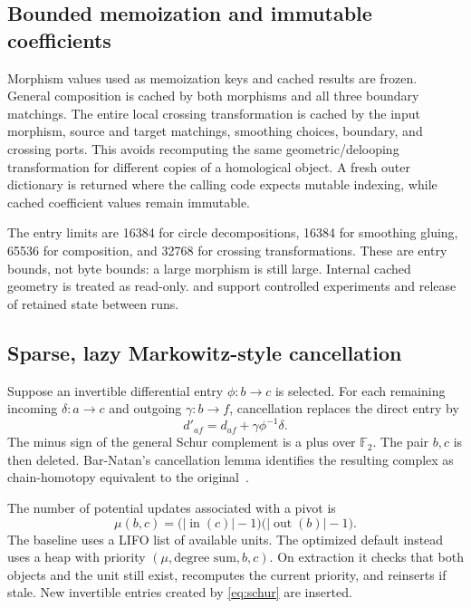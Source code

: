 \documentclass[11pt,letterpaper]{article}
\theoremstyle{definition}\newtheorem{definition}[theorem]{Definition}
\theoremstyle{remark}\newtheorem{remark}[theorem]{Remark}
\newcommand{\F}{\mathbb F}
\newcommand{\code}[1]{\texttt{\detokenize{#1}}}
\begin{document}
\subsection{Bounded memoization and immutable coefficients}

Morphism values used as memoization keys and cached results are frozen. General
composition is cached by both morphisms and all three boundary matchings. The
entire local crossing transformation is cached by the input morphism, source and
target matchings, smoothing choices, boundary, and crossing ports. This avoids
recomputing the same geometric/delooping transformation for different copies of
a homological object. A fresh outer dictionary is returned where the calling
code expects mutable indexing, while cached coefficient values remain immutable.

The entry limits are 16384 for circle decompositions, 16384 for smoothing gluing,
65536 for composition, and 32768 for crossing transformations. These are entry
bounds, not byte bounds: a large morphism is still large. Internal cached geometry
is treated as read-only. \code{clear_caches()} and \code{cache_info()} support
controlled experiments and release of retained state between runs.

\subsection{Sparse, lazy Markowitz-style cancellation}

Suppose an invertible differential entry $\phi:b\to c$ is selected. For each
remaining incoming $\delta:a\to c$ and outgoing $\gamma:b\to f$, cancellation
replaces the direct entry by
\begin{equation}\label{eq:schur}
 d'_{af}=d_{af}+\gamma\phi^{-1}\delta.
\end{equation}
The minus sign of the general Schur complement is a plus over $\F_2$. The pair
$b,c$ is then deleted. Bar-Natan's cancellation lemma identifies the resulting
complex as chain-homotopy equivalent to the original~\cite[Lemma~4.2]{bn}.

The number of potential updates associated with a pivot is
\[
 \mu(b,c)=\bigl(|\operatorname{in}(c)|-1\bigr)
          \bigl(|\operatorname{out}(b)|-1\bigr).
\]
The baseline uses a LIFO list of available units. The optimized default instead
uses a heap with priority $(\mu,\text{degree sum},b,c)$. On extraction it checks
that both objects and the unit still exist, recomputes the current priority,
and reinserts if stale. New invertible entries created by
\eqref{eq:schur} are inserted.
\end{document}
